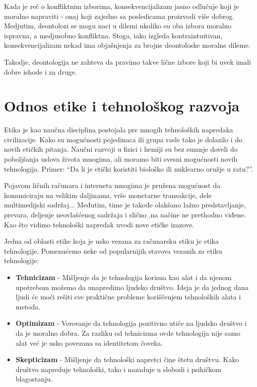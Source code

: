 \documentclass[a4paper]{article}
\begin{document}
Kada je reč o konfliktnim izborima, konsekvencijalizam jasno odlučuje koji je moralno napraviti - onaj koji zajedno sa posledicama proizvodi više dobrog. Medjutim, deontolozi se mogu naci u dilemi ukoliko su oba izbora moralno ispravna, a medjusobno konfliktna. Stoga, iako izgleda kontraintuitivan, konsekvencijalizam nekad ima objašnjenja za brojne deontoloske moralne dileme.

Takodje, deontologija ne zahteva da pravimo takve lične izbore koji bi uvek imali dobre ishode i za druge. 


\section{Odnos etike i tehnološkog razvoja}

Etika je kao naučna disciplina postojala pre mnogih tehnoloških napredaka civilizacije. Kako su mogućnosti pojedinaca ili grupa rasle tako je dolazilo i do novih etičkih pitanja. Naučni razvoji u fizici i hemiji su bez sumnje doveli do poboljšanja uslova života mnogima, ali moramo biti svesni mogućnosti novih tehnologija. Primer: ``Da li je etički koristiti biološko ili nuklearno oružje u ratu?''.

Pojavom ličnih računara i interneta mnogima je pružena mogućnost da komuniciraju na velikim daljinama, vrše monetarne transakcije, dele multimedijski sadržaj... Međutim, time je takođe olakšano lažno predstavljanje, prevara, deljenje neovlašćenog sadržaja i slično ,na načine ne prethodno viđene.
Kao što vidimo tehnološki napredak uvodi nove etičke izazove.

Jedna od oblasti etike koja je usko vezana za računarsku etiku je etika tehnologije. Pomenućemo neke od popularnijih stavova vezanih za etiku tehnologije:
\begin{itemize}
	\item \textbf{Tehnicizam} -
	Mišljenje da je tehnologija korisna kao alat i da njenom upotrebom možemo da unapredimo ljudsko društvo. Ideja je da jednog dana ljudi će moći rešiti sve praktične probleme koriščenjem tehnoloških alata i metoda.
	\item \textbf{Optimizam} - Verovanje da tehnologija pozitivno utiče na ljudsko društvo i da je moralno dobra. Za razliku od tehnicizma ovde tehnologija nije samo alat već je usko povezana sa identitetom čoveka.
	\item \textbf{Skepticizam} - Mišljenje da tehnološki napretci čine štetu društvu.
	Kako društvo napreduje tehnološki, tako i nazaduje u slobodi i psihičkom blagostanju.
\end{itemize}
\end{document}
